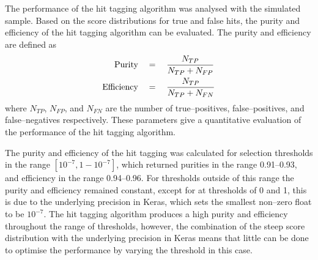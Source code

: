 The performance of the hit tagging algorithm was analysed with the simulated
sample. Based on the score distributions for true and false hits, the purity
and efficiency of the hit tagging algorithm can be evaluated. The purity and 
efficiency are defined as
\begin{align*}
	\mbox{Purity} \quad &= \quad  \frac{N_{TP}}{N_{TP} + N_{FP}} \\
	\vspace{2mm}
	\mbox{Efficiency} \quad &= \quad \frac{N_{TP}}{N_{TP} + N_{FN}}
\end{align*}
where $N_{TP}$, $N_{FP}$, and $N_{FN}$ are the number of true--positives,
false--positives, and false--negatives respectively. These parameters give a
quantitative evaluation of the performance of the hit tagging algorithm.

The purity and efficiency of the hit tagging was calculated for selection 
thresholds in the range $[10^{-7}, 1 - 10^{-7}]$, which returned purities in 
the range 0.91--0.93, and efficiency in the range 0.94--0.96. For thresholds 
outside of this range the purity and efficiency remained constant, except 
for at thresholds of 0 and 1, this is due to the underlying precision in 
Keras, which sets the smallest non--zero float to be $10^{-7}$. The hit tagging 
algorithm produces a high purity and efficiency throughout the range of 
thresholds, however, the combination of the steep score distribution with the 
underlying precision in Keras means that little can be done to optimise the 
performance by varying the threshold in this case.

